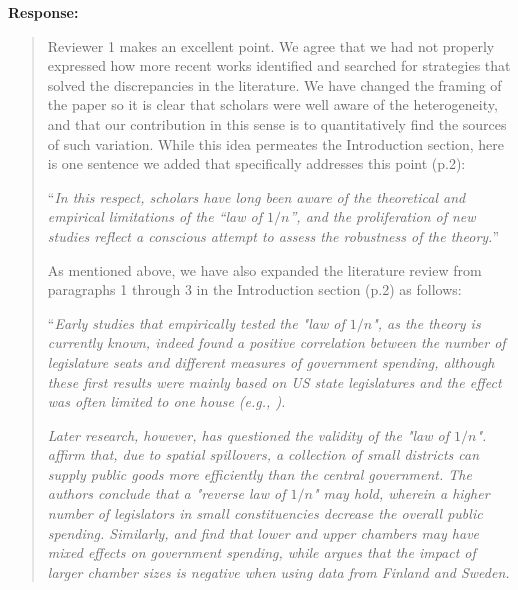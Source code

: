 \documentclass[a4paper,12pt]{article}
\begin{document}
\vspace{.3cm}

\noindent \textbf{Response:} 
\begin{quote}
    Reviewer 1 makes an excellent point. We agree that we had not properly expressed how more recent works identified and searched for strategies that solved the discrepancies in the literature. We have changed the framing of the paper so it is clear that scholars were well aware of the heterogeneity, and that our contribution in this sense is to quantitatively find the sources of such variation. While this idea permeates the Introduction section, here is one sentence we added that specifically addresses this point (p.2): 
    
    ``\textit{In this respect, scholars have long been aware of the theoretical and empirical limitations of the ``law of $1/n$'', and the proliferation of new studies reflect a conscious attempt to assess the robustness of the theory.}''
    
    As mentioned above, we have also expanded the literature review from paragraphs 1 through 3 in the Introduction section (p.2) as follows:
    
    ``\textit{Early studies that empirically tested the "law of $1/n$", as the theory is currently known, indeed found a positive correlation between the number of legislature seats and different measures of government spending, although these first results were mainly based on US state legislatures and the effect was often limited to one house (e.g., \citet{baqir2002districting, gilligan1995deviations, gilligan2001fiscal}).} 

    \textit{Later research, however, has questioned the validity of the "law of $1/n$". \citet{primo2008distributive} affirm that, due to spatial spillovers, a collection of small districts can supply public goods more efficiently than the central government. The authors conclude that a "reverse law of $1/n$" may hold, wherein a higher number of legislators in small constituencies decrease the overall public spending. Similarly, \citet{primo2006stop} and \citet{chen2007law} find that lower and upper chambers may have mixed effects on government spending, while \citet{petterssonlidbom2012size} argues that the impact of larger chamber sizes is negative when using data from Finland and Sweden.}


\end{quote}
\end{document}

